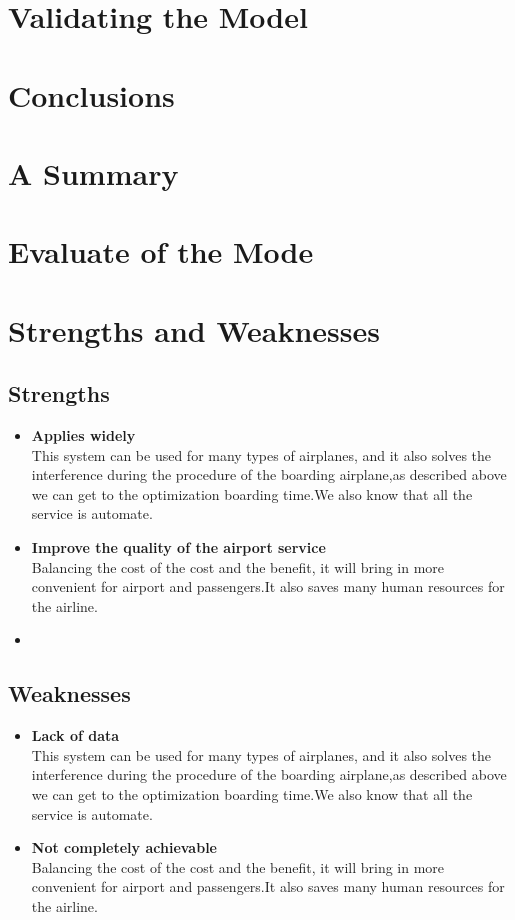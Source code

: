 \documentclass{mcmthesis}
\begin{document}
\section{Validating the Model}%

\section{Conclusions}%


\section{A Summary}%

\section{Evaluate of the Mode}%

\section{Strengths and Weaknesses}%

\subsection{Strengths}
\begin{itemize}
\item \textbf{Applies widely}\\
This  system can be used for many types of airplanes, and it also
solves the interference during  the procedure of the boarding
airplane,as described above we can get to the  optimization
boarding time.We also know that all the service is automate.
\item \textbf{Improve the quality of the airport service}\\
Balancing the cost of the cost and the benefit, it will bring in
more convenient  for airport and passengers.It also saves many
human resources for the airline. 
\item \textbf{}
\end{itemize}

\subsection{Weaknesses}
\begin{itemize}
\item \textbf{Lack of data}\\
This  system can be used for many types of airplanes, and it also
solves the interference during  the procedure of the boarding
airplane,as described above we can get to the  optimization
boarding time.We also know that all the service is automate.
\item \textbf{Not completely achievable}\\
Balancing the cost of the cost and the benefit, it will bring in
more convenient  for airport and passengers.It also saves many
human resources for the airline. 
\end{itemize}
\end{document}
